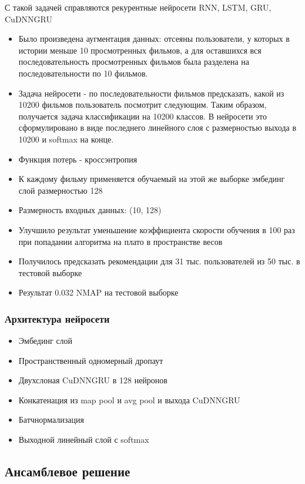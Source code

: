 \documentclass[11pt]{article}
\begin{document}
{{С такой задачей справляются рекурентные нейросети RNN, LSTM, GRU, CuDNNGRU \cite{fi2020predict}  
\begin{itemize}
\item Было произведена аугментация данных: отсеяны пользователи, у которых в истории меньше 10 просмотренных фильмов, а для оставшихся вся последовательность просмотренных фильмов была разделена на последовательности по 10 фильмов.
\item Задача нейросети - по последовательности фильмов предсказать, какой из 10200 фильмов пользователь посмотрит следующим. Таким образом, получается задача классификации на 10200 классов. В нейросети это сформулировано в виде последнего линейного слоя с размерностью выхода в 10200 и softmax на конце.
\item Функция потерь - кроссэнтропия
\item К каждому фильму применяется обучаемый на этой же выборке эмбединг слой размерностью 128
\item Размерность входных данных: (10, 128)
\item Улучшило результат уменьшение коэффициента скорости обучения в 100 раз при попадании алгоритма на плато в пространстве весов \cite{smith2015cyclical}
\item Получилось предсказать рекомендации для 31 тыс. пользователей из 50 тыс. в тестовой выборке
\item Результат 0.032 NMAP на тестовой выборке
\end{itemize}

\subsubsection{Архитектура нейросети}
\label{sec:org0f1c4ee}
\begin{itemize}
\item Эмбединг слой
\item Пространственный одномерный дропаут
\item Двухслоная CuDNNGRU в 128 нейронов
\item Конкатенация из map pool и avg pool и выхода CuDNNGRU
\item Батчнормализация
\item Выходной линейный слой с softmax
\end{itemize}
\subsection{Ансамблевое решение}
\label{sec:org5cbc917}
}}
\end{document}
